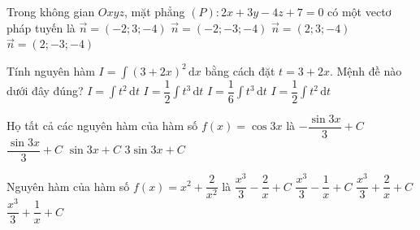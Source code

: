 \begin{ex}%
Trong không gian $O x y z$, mặt phẳng $(P): 2 x+3 y-4 z+7=0$ có một vectơ pháp tuyến là
\choice
{$\vec{n}=(-2 ; 3 ;-4)$}
{$\vec{n}=(-2 ;-3 ;-4)$}
{\True $\vec{n}=(2 ; 3 ;-4)$}
{$\vec{n}=(2 ;-3 ;-4)$}
\end{ex}

\begin{ex}%
Tính nguyên hàm $I=\displaystyle\int\limits (3+2x)^2\mathrm{\,d}x$ bằng cách đặt $t=3+2x$. Mệnh đề nào dưới đây đúng?
\choice
{$I=\displaystyle\int\limits t^2\mathrm{\,d}t$}
{$I=\dfrac{1}{2}\displaystyle\int\limits t^3\mathrm{\,d}t$}
{$I=\dfrac{1}{6}\displaystyle\int\limits t^3\mathrm{\,d}t$}
{\True $I=\dfrac{1}{2}\displaystyle\int\limits t^2\mathrm{\,d}t$}
\end{ex}

\begin{ex}%
Họ tất cả các nguyên hàm của hàm số $f(x)=\cos 3x$ là
\choice
{$-\dfrac{\sin 3x}{3}+C$}
{\True $\dfrac{\sin 3x}{3}+C$}
{$\sin 3x+C$}
{$3 \sin 3x+C$}
\end{ex}

\begin{ex}%
Nguyên hàm của hàm số $f(x)=x^2+\dfrac{2}{x^2}$ là
\choice
{\True $\dfrac{x^3}{3}-\dfrac{2}{x}+C$}
{$\dfrac{x^3}{3}-\dfrac{1}{x}+C$}
{$\dfrac{x^3}{3}+\dfrac{2}{x}+C$}
{$\dfrac{x^3}{3}+\dfrac{1}{x}+C$}
\end{ex}


